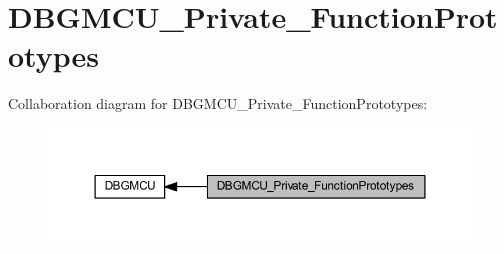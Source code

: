 \hypertarget{group___d_b_g_m_c_u___private___function_prototypes}{}\section{D\+B\+G\+M\+C\+U\+\_\+\+Private\+\_\+\+Function\+Prototypes}
\label{group___d_b_g_m_c_u___private___function_prototypes}
Collaboration diagram for D\+B\+G\+M\+C\+U\+\_\+\+Private\+\_\+\+Function\+Prototypes\+:
\nopagebreak
\begin{figure}[H]
\begin{center}
\leavevmode
\includegraphics[width=350pt]{group___d_b_g_m_c_u___private___function_prototypes}
\end{center}
\end{figure}
